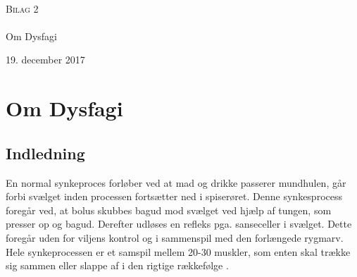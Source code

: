 

\begin{titlingpage}
\begin{center}

~ \\[3cm]


\textsc{\LARGE Bilag 2}\\[1.5cm]


\noindent\makebox[\linewidth]{\rule{\textwidth}{0.4pt}}\\
[0.5cm]{\Huge Om Dysfagi}
\noindent\makebox[\linewidth]{\rule{\textwidth}{0.4pt}}
\end{center}
\vfill
\begin{center}
{\large 19. december 2017}
\end{center}
\end{titlingpage}

\newpage
\tableofcontents*
\newpage


\chapter{Om Dysfagi}
\section{Indledning}
En normal synkeproces forløber ved at mad og drikke passerer mundhulen, går forbi svælget inden processen fortsætter ned i spiserøret. Denne synkesprocess foregår ved, at bolus skubbes bagud mod svælget ved hjælp af tungen, som presser op og bagud. Derefter udløses en refleks pga. sanseceller i svælget. Dette foregår uden for viljens kontrol og i sammenspil med den forlængede rygmarv. Hele synkeprocessen er et samspil mellem 20-30 muskler, som enten skal trække sig sammen eller slappe af i den rigtige rækkefølge \cite{Sand2008}. 

